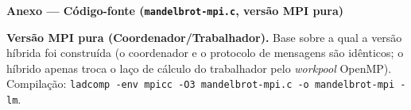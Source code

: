 \documentclass[10pt,a4paper]{article}
\begin{document}
\newpage
\begin{center}{\large\bfseries Anexo --- Código-fonte (\texttt{mandelbrot-mpi.c}, versão MPI pura)}\end{center}
\vspace{3pt}
\textbf{Versão MPI pura (Coordenador/Trabalhador).} Base sobre a qual a versão híbrida foi construída (o coordenador e o protocolo de mensagens são idênticos; o híbrido apenas troca o laço de cálculo do trabalhador pelo \emph{workpool} OpenMP). Compilação: \texttt{ladcomp -env mpicc -O3 mandelbrot-mpi.c -o mandelbrot-mpi -lm}.
\nopagebreak

\end{document}
